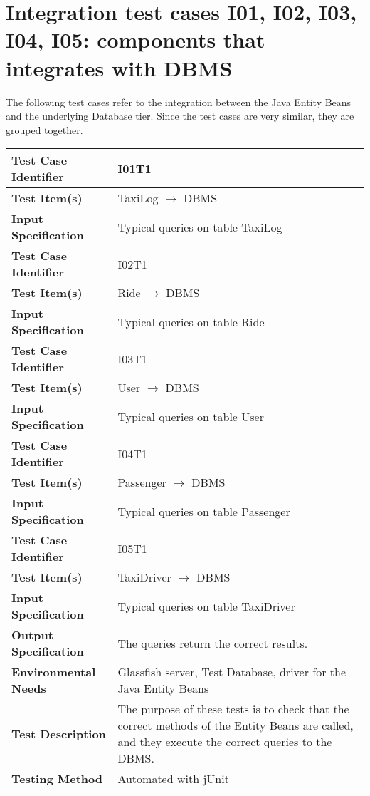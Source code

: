 \vspace{2em}

\section{Integration test cases I01, I02, I03, I04, I05: components that integrates with DBMS}

The following test cases refer to the integration between the Java Entity Beans and the underlying Database tier.
Since the test cases are very similar, they are grouped together.

\begin{tabular}{l p{}}
    \hline
    \textbf{Test Case Identifier} & I01T1\\
    \hline
    \textbf{Test Item(s)} & TaxiLog $\rightarrow$ DBMS \\
    \hline
    \textbf{Input Specification} & Typical queries on table TaxiLog \\
    \hline
    \hline
    \textbf{Test Case Identifier} & I02T1\\
    \hline
    \textbf{Test Item(s)} & Ride $\rightarrow$ DBMS \\
    \hline
    \textbf{Input Specification} & Typical queries on table Ride \\
    \hline
    \hline
    \textbf{Test Case Identifier} & I03T1\\
    \hline
    \textbf{Test Item(s)} & User $\rightarrow$ DBMS \\
    \hline
    \textbf{Input Specification} & Typical queries on table User \\
    \hline
    \hline
    \textbf{Test Case Identifier} & I04T1\\
    \hline
    \textbf{Test Item(s)} & Passenger $\rightarrow$ DBMS \\
    \hline
    \textbf{Input Specification} & Typical queries on table Passenger \\
    \hline
    \hline
    \textbf{Test Case Identifier} & I05T1\\
    \hline
    \textbf{Test Item(s)} & TaxiDriver $\rightarrow$ DBMS \\
    \hline
    \textbf{Input Specification} & Typical queries on table TaxiDriver \\
    \hline
    \hline
    \textbf{Output Specification} & The queries return the correct results. \\
    \hline
    \textbf{Environmental Needs} & Glassfish server, Test Database, driver for the Java Entity Beans \\
    \hline
    \textbf{Test Description} & The purpose of these tests is to check that the correct methods of the Entity Beans are called, and they execute the correct queries to the DBMS.  \\
    \hline
    \textbf{Testing Method} & Automated with jUnit \\
    \hline
\end{tabular}

